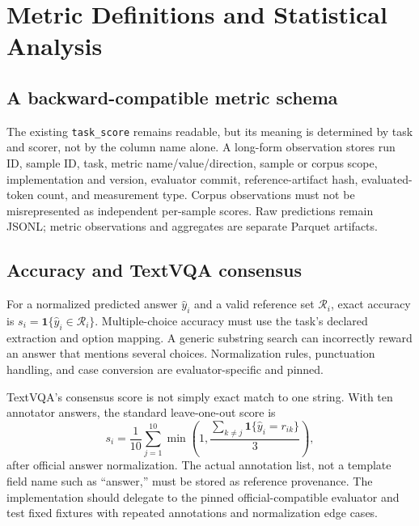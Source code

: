 \section{Metric Definitions and Statistical Analysis}
\label{app:metrics}
\subsection{A backward-compatible metric schema}
The existing \texttt{task\_score} remains readable, but its meaning is determined
by task and scorer, not by the column name alone. A long-form observation stores
run ID, sample ID, task, metric name/value/direction, sample or corpus scope,
implementation and version, evaluator commit, reference-artifact hash,
evaluated-token count, and measurement type. Corpus observations must not be
misrepresented as independent per-sample scores. Raw predictions remain JSONL;
metric observations and aggregates are separate Parquet artifacts.

\subsection{Accuracy and TextVQA consensus}
For a normalized predicted answer $\widehat y_i$ and a valid reference set
$\mathcal R_i$, exact accuracy is
$s_i=\mathbf1\{\widehat y_i\in\mathcal R_i\}$.
Multiple-choice accuracy must use the task's declared extraction and option
mapping. A generic substring search can incorrectly reward an answer that
mentions several choices. Normalization rules, punctuation handling, and case
conversion are evaluator-specific and pinned.

TextVQA's consensus score is not simply exact match to one string. With ten
annotator answers, the standard leave-one-out score is
\begin{equation}
 s_i=\frac1{10}\sum_{j=1}^{10}
 \min\!\left(1,\frac{\sum_{k\ne j}\mathbf1\{\widehat y_i=r_{ik}\}}3\right),
\end{equation}
after official answer normalization. The actual annotation list, not a template
field name such as ``answer,'' must be stored as reference provenance.
The implementation should delegate to the pinned official-compatible evaluator
and test fixed fixtures with repeated annotations and normalization edge cases.

